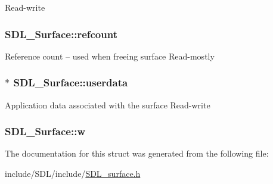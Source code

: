 Read-\/write \hypertarget{struct_s_d_l___surface_a03d10628a359c0674f5ceffd574f1641}{
\subsubsection[{refcount}]{ S\-D\-L\-\_\-\-Surface\-::refcount}}\label{struct_s_d_l___surface_a03d10628a359c0674f5ceffd574f1641}
Reference count -- used when freeing surface Read-\/mostly \hypertarget{struct_s_d_l___surface_ae66d973dcb9b57cb34815892e1ee1f31}{
\subsubsection[{userdata}]{$\ast$ S\-D\-L\-\_\-\-Surface\-::userdata}}\label{struct_s_d_l___surface_ae66d973dcb9b57cb34815892e1ee1f31}
Application data associated with the surface Read-\/write \hypertarget{struct_s_d_l___surface_a9b0ec7185dcdb2a3530a9160a6ea83d9}{
\subsubsection[{w}]{ S\-D\-L\-\_\-\-Surface\-::w}}\label{struct_s_d_l___surface_a9b0ec7185dcdb2a3530a9160a6ea83d9}


The documentation for this struct was generated from the following file\-:\begin{DoxyCompactItemize}
\item 
include/\-S\-D\-L/include/\hyperlink{_s_d_l__surface_8h}{S\-D\-L\-\_\-surface.\-h}\end{DoxyCompactItemize}
